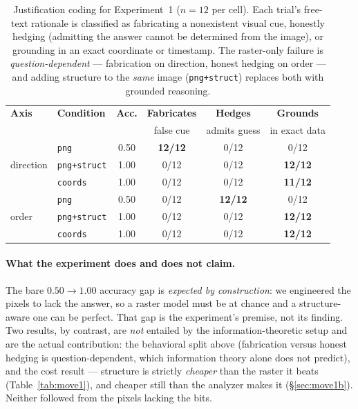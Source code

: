 \documentclass[11pt]{article}
\newcommand{\code}[1]{\texttt{#1}}
\begin{document}
\begin{table}[t]
\centering
\small
\begin{tabular}{@{}ll c ccc@{}}
\toprule
\textbf{Axis} & \textbf{Condition} & \textbf{Acc.} & \textbf{Fabricates} & \textbf{Hedges} & \textbf{Grounds} \\
 & & & \footnotesize false cue & \footnotesize admits guess & \footnotesize in exact data \\
\midrule
\multirow{3}{*}{direction}
 & \code{png}        & 0.50 & \textbf{12/12} & 0/12 & 0/12 \\
 & \code{png+struct} & 1.00 & 0/12 & 0/12 & \textbf{12/12} \\
 & \code{coords}     & 1.00 & 0/12 & 0/12 & \textbf{11/12} \\
\midrule
\multirow{3}{*}{order}
 & \code{png}        & 0.50 & 0/12 & \textbf{12/12} & 0/12 \\
 & \code{png+struct} & 1.00 & 0/12 & 0/12 & \textbf{12/12} \\
 & \code{coords}     & 1.00 & 0/12 & 0/12 & \textbf{12/12} \\
\bottomrule
\end{tabular}
\caption{Justification coding for Experiment~1 ($n=12$ per cell). Each trial's
free-text rationale is classified as fabricating a nonexistent visual cue,
honestly hedging (admitting the answer cannot be determined from the image), or
grounding in an exact coordinate or timestamp. The raster-only failure is
\emph{question-dependent} --- fabrication on direction, honest hedging on order ---
and adding structure to the \emph{same} image (\code{png+struct}) replaces both
with grounded reasoning.}
\label{tab:coding}
\end{table}

\paragraph{What the experiment does and does not claim.} The bare
$0.50\rightarrow1.00$ accuracy gap is \emph{expected by construction}: we
engineered the pixels to lack the answer, so a raster model must be at chance and
a structure-aware one can be perfect. That gap is the experiment's premise, not
its finding. Two results, by contrast, are \emph{not} entailed by the
information-theoretic setup and are the actual contribution: the behavioral split
above (fabrication versus honest hedging is question-dependent, which information
theory alone does not predict), and the cost result --- structure is strictly
\emph{cheaper} than the raster it beats (Table~\ref{tab:move1}), and cheaper still
than the analyzer makes it (\S\ref{sec:move1b}). Neither followed from the pixels
lacking the bits.
\end{document}
